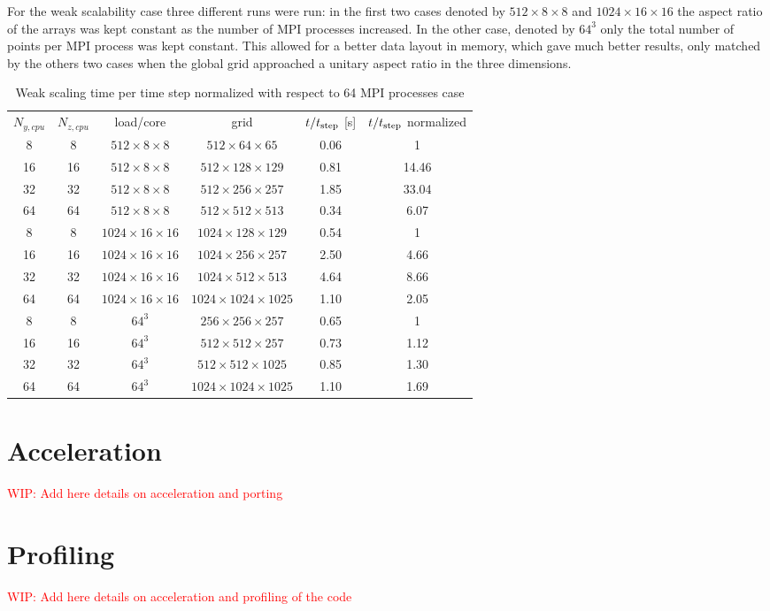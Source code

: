 For the weak scalability case three different runs were run: in the first two cases denoted by $512\times8\times8$ and $1024\times16\times16$ the aspect ratio of the arrays was kept constant as the number of MPI processes increased. In the other case, denoted by $64^3$ only the total number of points per MPI process was kept constant. This allowed for a better data layout in memory, which gave much better results, only matched by the others two cases when the global grid approached a unitary aspect ratio in the three dimensions.
\begin{table}[H]
\centering
\caption{Weak scaling time per time step normalized with respect to 64 MPI processes case}
\begin{tabular}{c|c|c|c|c|c}
$N_{y,cpu}$ & $N_{z,cpu}$& load/core & grid & $t/t_{\textnormal{step}}$ [s] &$t/t_{\textnormal{step}}$ normalized\\[1.5ex]
8& 8 & $512\times8\times8$  &$512\times64\times65$ &  0.06 & 1\\
16 &16&$512\times8\times8$  & $512\times128\times129$& 0.81 & 14.46\\
32 &32&$512\times8\times8$  & $512\times256\times257$& 1.85 & 33.04\\
64 &64 &$512\times8\times8$  &$512\times512\times513$ & 0.34 & 6.07 \\
\hline
8& 8&$1024\times16\times16$  & $1024\times128\times129$ &0.54 &1 \\
16& 16& $1024\times16\times16$  & $1024\times256\times257$ &2.50 & 4.66\\
32 &32 &$1024\times16\times16$  & $1024\times512\times513$ &4.64 & 8.66\\
64 &64 &$1024\times16\times16$  & $1024\times1024\times1025$ &1.10 & 2.05\\
\hline
8& 8 & $64^3$& $256\times256\times257$ & 0.65& 1\\
16& 16&$64^3$&$512\times512\times257$ & 0.73 &1.12 \\
32& 32 &$64^3$&$512\times512\times1025$ &0.85 & 1.30 \\
64& 64 &$64^3$&$1024\times1024\times1025$ &1.10 &1.69 \\ 
\end{tabular}
\end{table}



\section{Acceleration}
\label{sec: acceleration}
\textcolor{red}{WIP: Add here details on acceleration and porting}


\section{Profiling}
\label{sec: profiling}
\textcolor{red}{WIP: Add here details on acceleration and profiling of the code}



